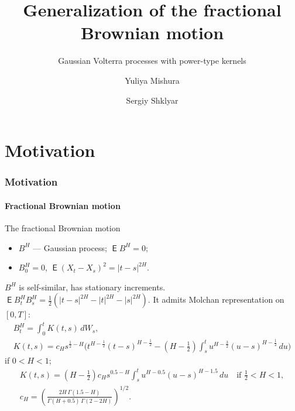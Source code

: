 \documentclass{beamer}
\title{Generalization of the fractional Brownian motion}
\subtitle{Gaussian Volterra processes with power-type kernels}
\author{Yuliya Mishura \and Sergiy Shklyar}
\DeclareMathOperator{\ME}{\mathsf{E}}
\theoremstyle{plain}
\theoremstyle{definition}
\theoremstyle{remark}
\begin{document}
\begin{frame}
	\titlepage
\end{frame}
\section{Motivation}
\begin{frame}
	\frametitle{Motivation}
	\framesubtitle{Fractional Brownian motion}
The fractional Brownian motion
\begin{itemize}
	\item $B^H$ --- Gaussian process; $\ME B^H = 0$;
	\item $B^H_0=0$,  $\ME(X_t-X_s)^2 = |t-s|^{2H}$.
\end{itemize}
$B^H$ is self-similar, has stationary increments.
$\ME B^H_t B^H_s = \frac{1}{2} \left(|t-s|^{2H}
- |t|^{2H} - |s|^{2H}\right)$.
It admits Molchan representation on $[0,T]$:
\begin{gather*}
B^H_t = \int_0^t K(t,s) \, dW_s, \\
		K(t,s) = c_H s^{\frac12-H} \biggl( t^{H-\frac12} (t{-}s)^{H-\frac12}
		- 
\left(H{-}{\textstyle\frac12}\right) \int_s^t u^{H-\frac32} (u{-}s)^{H-\frac12}\, du
		\biggr)  %
\end{gather*}
if $0<H<1$;
\begin{gather*}
K(t,s) = 
\left(H{-}{\textstyle\frac12}\right) c_H
s^{0.5-H} \int_s^t u^{H-0.5} (u-s)^{H-1.5} \, du \quad
\mbox{if $\frac12{<}H{<}1$},
\\
c_H = \left( \frac
{2 H \, \Gamma(1.5-H)}
{\Gamma(H+0.5)\, \Gamma(2-2H)}
\right)^{1/2} .
\end{gather*}
\end{frame}
\end{document}

